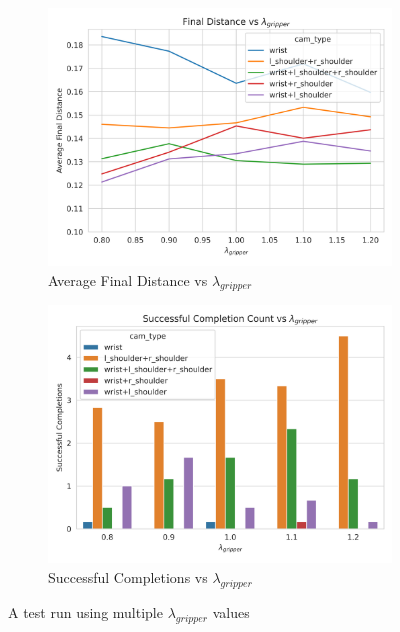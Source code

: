 \begin{figure}[htpb] %
  \centering
  \begin{subfigure}{0.45\linewidth}
    \centering
    \includegraphics[width=0.8\linewidth]{assets/cam-comb/grasp-simple/tuning-normal-old-policy-lambda-g.png}
    \caption{Average Final Distance vs $\lambda_{gripper}$}\label{subfig:grasp-tuning-lambda-g}
  \end{subfigure}
  \begin{subfigure}{0.45\linewidth}
    \centering
    \includegraphics[width=0.8\linewidth]{assets/cam-comb/grasp-simple/tuning-normal-old-policy-success-lambda-g.png}
    \caption{Successful Completions vs $\lambda_{gripper}$}\label{subfig:grasp-tuning-lambda-g-success}
  \end{subfigure}
  \caption{A test run using multiple $\lambda_{gripper}$ values}\label{fig:grasp-tuning-lambda-g}
\end{figure}


